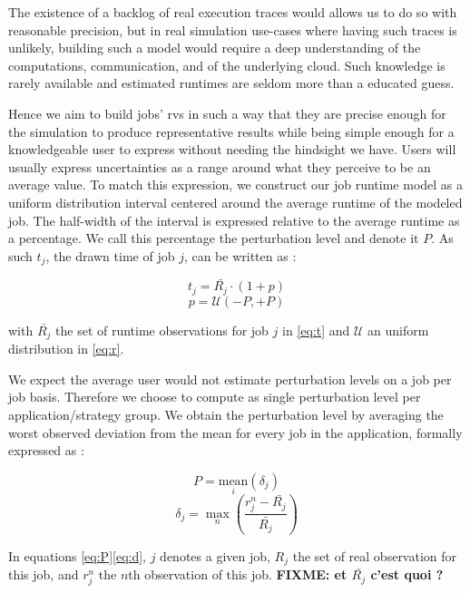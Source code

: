 \documentclass[10pt,conference,compsocconf]{IEEEtran}
\begin{document}
The existence of a backlog of real execution traces would allows us to do so with
reasonable precision, but in real simulation use-cases where having such traces
is unlikely, building such a model would require a deep understanding of the
computations, communication, and of the underlying cloud. Such knowledge is
rarely available and estimated runtimes are seldom more than a educated guess.

Hence we aim to build jobs' \acp{rv} in  such a way that they are precise enough
for the simulation  to produce representative results while  being simple enough
for  a knowledgeable  user to  express without  needing the  hindsight we  have.
Users will usually express uncertainties as a range around what they perceive to
be an  average value.  To match  this expression, we  construct our  job runtime
model as a uniform distribution interval  centered around the average runtime of
the modeled  job. The half-width  of the interval  is expressed relative  to the
average runtime as a percentage. We  call this percentage the perturbation level
and denote it $P$. As such $t_j$, the drawn time of job $j$, can be written as :

\begin{equation}
	t_j = \bar{R_j} \cdot (1 + p)
	\label{eq:t}
\end{equation}
\begin{equation}
	p = \mathcal{U}(-P,+P)
	\label{eq:r}
\end{equation}

with $\bar{R_j}$ the set of runtime observations for job $j$ in \eqref{eq:t} and
$\mathcal{U}$ an uniform distribution in \eqref{eq:r}.  

We expect the average  user would not estimate perturbation levels  on a job per
job  basis. Therefore  we choose  to compute  as single  perturbation level  per
application/strategy group.  We obtain the  perturbation level by  averaging the
worst  observed deviation  from  the  mean for  every  job  in the  application,
formally expressed as :

\begin{equation}
P = \underset{i}{\textrm{mean}}(\delta{}_j)
\label{eq:P}
\end{equation}
\begin{equation}
\delta{}_j =
\max_n\left(\frac{r_j^n-\bar{R_j}}{\bar{R_j}}\right)
\label{eq:d}
\end{equation}

In equations \eqref{eq:P}\eqref{eq:d}, $j$ denotes a given job, $R_j$ the set of real
observation for this job, and $r_j^n$ the $n$th observation of this job.
\textbf{FIXME: et $\bar{R_j}$ c'est quoi ?}
\end{document}
